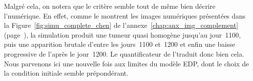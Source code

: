 \documentclass[main.tex]{subfiles}
\begin{document}
Malgré cela, on notera que le critère semble tout de même bien décrire l'\hetero numérique. 
En effet, comme le montrent les images numériques présentées dans la Figure~\ref{fig:simu_complete_chen} de l'annexe~\ref{chap:anx_img_complement} (page~\pageref{fig:simu_complete_chen}), la simulation produit une tumeur quasi homogène jusqu'au jour~1100, puis une apparition brutale d'\hetero entre les jours~1100 et~1200 et enfin une baisse progressive de l'\hetero après le jour~1200. Le quantificateur de l'\hetero \HH traduit donc bien cela. Nous parvenons ici une nouvelle fois aux limites du modèle EDP, dont le choix de la condition initiale semble prépondérant.
\end{document}
